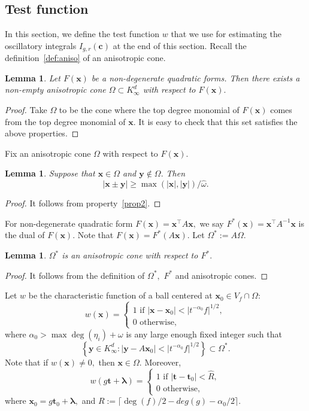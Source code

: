 \documentclass[11pt]{amsart}
\theoremstyle{plain}
\theoremstyle{plain}
\newtheorem{lemma}[theorem]{Lemma}
\renewcommand{\vec}[1]{\mathbf{#1}}
\theoremstyle{remark}
\theoremstyle{definition}
\renewcommand{\hat}{\widehat}
\newcommand{\hR}{\widehat{R}}
\begin{document}
\subsection{Test function}
In this section, we define the test function $w$ that we use for estimating the oscillatory integrals $I_{g,r}(\vec{c})$ at the end of this section. Recall the definition~\ref{def:aniso} of an anisotropic cone.
\begin{lemma}\label{cone}
Let $F(\vec{x})$ be a non-degenerate quadratic forms. Then there exists a non-empty  anisotropic cone $\Omega\subset  K_\infty^d $ with respect to $F(\vec{x}).$ 
\end{lemma}
\begin{proof}
Take $\Omega$ to be the cone where the top degree monomial  of $F(\vec{x})$ comes from the top degree monomial of $\vec{x}.$ It is easy to check that this set satisfies the above properties. 
\end{proof}
Fix an anisotropic cone $\Omega$  with respect to $F(\vec{x}).$ 
\begin{lemma}\label{ultra}
Suppose that $\vec{x}\in \Omega$ and $\vec{y}\notin \Omega.$ Then
\[
|\vec{x}\pm \vec{y}|\geq \max{(|\vec{x}|,|\vec{y}|)}/\hat{\omega}.
\]
\end{lemma}
\begin{proof}
It follows from property~\eqref{prop2}.  
\end{proof}
For non-degenerate quadratic form $F(\vec{x})=\vec{x}^{\intercal}A\vec{x},$ we say $F^{*}(\vec{x})=\vec{x}^{\intercal}A^{-1}\vec{x}$ is the dual of $F(\vec{x}).$ Note that $F(\vec{x})=F^*(A\vec{x}).$   Let $\Omega^*:=A\Omega.$
\begin{lemma}\label{dualcone}
  $\Omega^*$ is an anisotropic cone with respect to $F^*.$ 
\end{lemma}
\begin{proof}
It follows from the definition of $\Omega^*,$ $F^*$ and anisotropic cones.
\end{proof}
  Let $w$ be the characteristic function of a ball centered at $\vec{x}_0\in V_{f}\cap\Omega:$
\[
w(\vec{x})=\begin{cases}
1 \text{ if } |\vec{x}-\vec{x}_0| < |t^{-\alpha_0}f|^{1/2},
\\
0 \text{ otherwise,}
\end{cases}
\]
where $\alpha_0> \max{\deg(\eta_i)}+\omega$ is any large enough fixed integer such that 
$$\left\{\vec{y}\in K_\infty^d: |\vec{y}-A\vec{x}_0|<  |t^{-\alpha_0}f|^{1/2} \right\}  \subset  \Omega^*.$$  Note that  
if $w(\vec{x})\neq 0,$ then $\vec{x}\in \Omega.$  Moreover, 
\[
w(g\vec{t}+\boldsymbol{\lambda})=\begin{cases}
1 \text{ if } |\vec{t}-\vec{t}_0|  < \hR,
\\
0 \text{ otherwise,}
\end{cases}
\]
where $\vec{x}_0=g\vec{t}_0+\boldsymbol{\lambda},$ and  $R:= \lceil{\deg(f)/2} -deg(g)-\alpha_0/2\rceil.$
\end{document}

